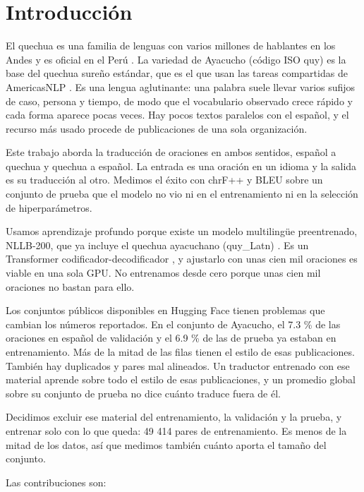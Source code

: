 \documentclass[conference]{IEEEtran}
\begin{document}
\section{Introducción}
El quechua es una familia de lenguas con varios millones de hablantes en los Andes y es oficial en el Perú \cite{r3}. La variedad de Ayacucho (código ISO quy) es la base del quechua sureño estándar, que es el que usan las tareas compartidas de AmericasNLP \cite{r3,r4}. Es una lengua aglutinante: una palabra suele llevar varios sufijos de caso, persona y tiempo, de modo que el vocabulario observado crece rápido y cada forma aparece pocas veces. Hay pocos textos paralelos con el español, y el recurso más usado procede de publicaciones de una sola organización.

Este trabajo aborda la traducción de oraciones en ambos sentidos, español a quechua y quechua a español. La entrada es una oración en un idioma y la salida es su traducción al otro. Medimos el éxito con chrF++ y BLEU sobre un conjunto de prueba que el modelo no vio ni en el entrenamiento ni en la selección de hiperparámetros.

Usamos aprendizaje profundo porque existe un modelo multilingüe preentrenado, NLLB-200, que ya incluye el quechua ayacuchano (quy\_Latn) \cite{r1}. Es un Transformer codificador-decodificador \cite{r2}, y ajustarlo con unas cien mil oraciones es viable en una sola GPU. No entrenamos desde cero porque unas cien mil oraciones no bastan para ello.

Los conjuntos públicos disponibles en Hugging Face tienen problemas que cambian los números reportados. En el conjunto de Ayacucho, el 7.3 \% de las oraciones en español de validación y el 6.9 \% de las de prueba ya estaban en entrenamiento. Más de la mitad de las filas tienen el estilo de esas publicaciones. También hay duplicados y pares mal alineados. Un traductor entrenado con ese material aprende sobre todo el estilo de esas publicaciones, y un promedio global sobre su conjunto de prueba no dice cuánto traduce fuera de él.

Decidimos excluir ese material del entrenamiento, la validación y la prueba, y entrenar solo con lo que queda: 49 414 pares de entrenamiento. Es menos de la mitad de los datos, así que medimos también cuánto aporta el tamaño del conjunto.

Las contribuciones son:
\end{document}
